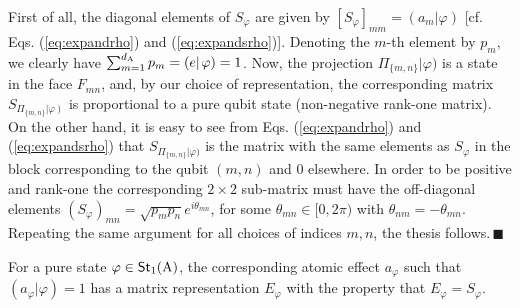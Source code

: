 \documentclass[12pt,aps,pra,showpacs,groupedaddress]{revtex4-1}
\def\Proof{\medskip\par\noindent{\bf Proof. }}
\def\qed{$\,\blacksquare$\par}
\def\Stset{{\mathsf{St}}}
\def\K#1{\left|#1\right)}  \def\B#1{\left(#1\right|}
\def\SC#1#2{\left(#1\right|\left.\!#2\right)}  \def\Tr{{\rm Tr}}
\begin{document}
\Proof First of all, the diagonal elements of $S_\varphi$ are given by $[S_{\varphi}]_{mm}  =  \SC  {a_m}  \varphi$ [cf. Eqs. (\ref{eq:expandrho}) and (\ref{eq:expandsrho})].  Denoting the $m$-th element by $p_m$, we clearly have  $\sum_{m=1}^{d_\rA}  p_m  =  \SC e \varphi = 1$.  Now,  the projection $\Pi_{\{m,n\}}|\varphi)$ is a state in the face $F_{mn}$,  and, by our choice of representation, the corresponding matrix $S_{\Pi_{\{m,n\}}  \K \varphi}$ is proportional to a pure qubit state (non-negative rank-one matrix). 
On the other hand,  it is easy to see from Eqs. (\ref{eq:expandrho}) and (\ref{eq:expandsrho})  that $S_{\Pi_{\{m,n\}}|\varphi)}$ is the matrix with the same elements as $S_\varphi$ in the block corresponding to the qubit $(m,n)$ and 0 elsewhere.  In order to be positive and rank-one the corresponding $2\times2$
sub-matrix must have the off-diagonal elements $(S_{\varphi})_{mn}=\sqrt{p_m p_n}e^{i\theta_{mn}}$, for some $\theta_{mn} \in [0, 2\pi)$ with $\theta_{nm}  =  - \theta_{mn}$.  Repeating the same argument for all choices of indices $m,n$, the thesis follows.\qed


\begin{theorem}
  For a pure state $\varphi \in\Stset_1(\rA)$, the corresponding atomic effect $a_\varphi$ such that
  $(a_\varphi|\varphi)=1$ has a matrix representation $E_{\varphi}$ with the property that
  $E_{\varphi}=S_\varphi$.
  \label{theo:E=S}
\end{theorem}
\end{document}
